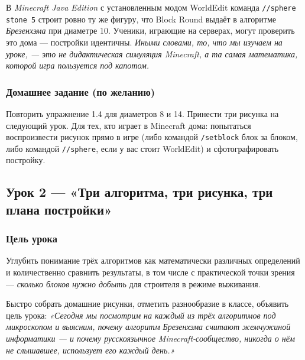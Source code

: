 \documentclass[12pt,a4paper]{scrartcl}
\newcommand{\cmd}[1]{\textcolor{earth}{\texttt{\small #1}}}
\newcommand{\tempo}[1]{\textnormal{\footnotesize\color{bg!90!white}\textsf{#1}}}
\begin{document}
\begin{minecraft}
В \emph{Minecraft Java Edition} с установленным модом WorldEdit команда \cmd{//sphere stone 5} строит ровно ту же фигуру, что Block Round выдаёт в алгоритме \emph{Брезенхэма} при диаметре 10. Ученики, играющие на серверах, могут проверить это дома --- постройки идентичны. \emph{Иными словами, то, что мы изучаем на уроке, --- это не дидактическая симуляция Minecraft, а та самая математика, которой игра пользуется под капотом.}
\end{minecraft}

\subsubsection*{Домашнее задание (по желанию)}
Повторить упражнение 1.4 для диаметров 8 и 14. Принести три рисунка на следующий урок. Для тех, кто играет в Minecraft дома: попытаться воспроизвести рисунок прямо в игре (либо командой \cmd{/setblock} блок за блоком, либо командой \cmd{//sphere}, если у вас стоит WorldEdit) и сфотографировать постройку.

\subsection{Урок 2 --- «Три алгоритма, три рисунка, три плана постройки»}\label{aula2}

\subsubsection*{Цель урока}
Углубить понимание трёх алгоритмов как математически различных определений и количественно сравнить результаты, в том числе с практической точки зрения --- \emph{сколько блоков нужно добыть} для строителя в режиме выживания.

\begin{zadanie}[2.1 --- Повторение \quad\tempo{5 мин}]
Быстро собрать домашние рисунки, отметить разнообразие в классе, объявить цель урока: \emph{«Сегодня мы посмотрим на каждый из трёх алгоритмов под микроскопом и выясним, почему алгоритм Брезенхэма считают жемчужиной информатики --- и почему русскоязычное Minecraft-сообщество, никогда о нём не слышавшее, использует его каждый день.»}
\end{zadanie}
\end{document}
